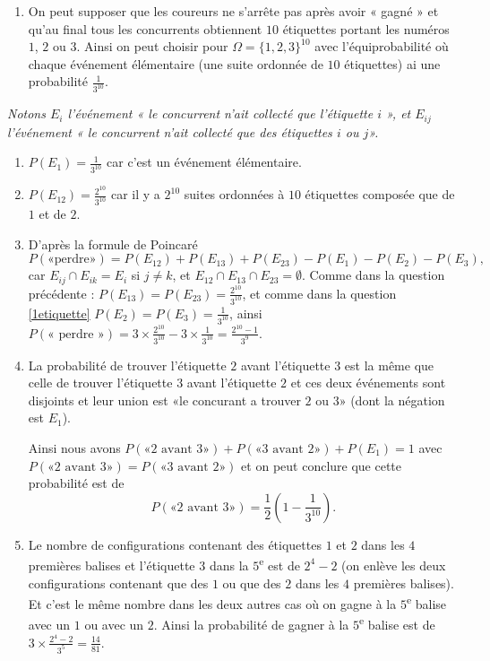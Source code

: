 \documentclass[a4paper,12pt,reqno]{amsart}
\begin{document}
\begin{solution}
  \begin{enumerate}
    \item On peut supposer que les coureurs ne s'arrête pas après avoir « gagné » et qu'au final tous les concurrents obtiennent $10$ étiquettes portant les numéros $1$, $2$ ou $3$. Ainsi on peut choisir pour $\Omega = \{1,2,3\}^{10}$ avec l'équiprobabilité où chaque événement élémentaire (une suite ordonnée de $10$ étiquettes) ai une probabilité $\frac{1}{3^{10}}$.
  \end{enumerate}

    \emph{Notons $E_{i}$ l'événement « le concurrent n'ait collecté que l'étiquette $i$ », et $E_{ij}$ l'événement « le concurrent n'ait collecté que des étiquettes $i$ ou $j$».}

  \begin{enumerate}[resume]
    \item\label{1etiquette} $P(E_{1}) = \frac{1}{3^{10}}$ car c'est un événement élémentaire.
    \item $P(E_{12}) = \frac{2^{10}}{3^{10}}$ car il y a $2^{10}$ suites ordonnées à $10$ étiquettes composée que de $1$ et de $2$.
    \item\label{perdre} D'après la formule de Poincaré
    $$
      P(\text{«perdre»}) = P(E_{12})+P(E_{13})+P(E_{23})-P(E_{1})-P(E_{2})-P(E_{3}),
    $$
    car $E_{ij} \cap E_{ik} = E_{i}$ si $j \neq k$, et $E_{12}\cap E_{13}\cap E_{23} = \emptyset$. Comme dans la question précédente : $P(E_{13}) = P(E_{23}) =\frac{2^{10}}{3^{10}}$, et comme dans la question \ref{1etiquette} $P(E_{2}) = P(E_{3}) = \frac{1}{3^{10}}$, ainsi $P(\text{« perdre »}) = 3 \times \frac{2^{10}}{3^{10}} - 3 \times \frac{1}{3^{10}}= \frac{2^{10}-1}{3^{9}}$.
    \item La probabilité de trouver l'étiquette $2$ avant l'étiquette $3$ est la même que celle de trouver l'étiquette $3$ avant l'étiquette $2$ et ces deux événements sont disjoints et leur union est «le concurant a trouver $2$ ou $3$» (dont la négation est $E_{1}$).

    Ainsi nous avons $P(\text{«$2$ avant $3$»}) + P(\text{«$3$ avant $2$»}) + P(E_{1}) = 1$ avec $P(\text{«$2$ avant $3$»}) = P(\text{«$3$ avant $2$»})$ et on peut conclure que cette probabilité est de
      $$
        P(\text{«$2$ avant $3$»}) = \frac{1}{2}(1-\frac{1}{3^{10}}).
      $$
    \item Le nombre de configurations contenant des étiquettes $1$ et $2$ dans les $4$ premières balises et l'étiquette $3$ dans la $5$\textsuperscript{e} est de $2^{4}-2$ (on enlève les deux configurations contenant que des $1$ ou que des $2$ dans les $4$ premières balises). Et c'est le même nombre dans les deux autres cas où on gagne à la $5$\textsuperscript{e} balise avec un $1$ ou avec un $2$. Ainsi la probabilité de gagner à la $5$\textsuperscript{e} balise est de $3 \times \frac{2^{4}-2}{3^{5}} = \frac{14}{81}$.
  \end{enumerate}

\end{solution}
\end{document}
